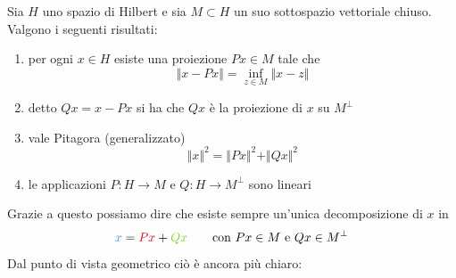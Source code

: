 \begin{thm}
Sia $H$ uno spazio di Hilbert e sia $M\subset H$ un suo sottospazio vettoriale chiuso. Valgono i seguenti risultati:

\renewcommand{\theenumi}{\roman{enumi}}
\begin{enumerate}
    \item per ogni $ x\in H$ esiste una proiezione $Px\in M$ tale che 
    $$
    \Vert x - Px \Vert =\inf_{z\in M} \Vert x-z \Vert
    $$
    \item detto $Qx=x-Px$ si ha che $Qx$ è la proiezione di $x$ su $M^{\perp}$ 
    \item vale Pitagora (generalizzato)
    $$
    \Vert x \Vert^{2} = \Vert Px \Vert^{2} + \Vert Qx \Vert^{2}
    $$
    \item le applicazioni $P: H\rightarrow M$ e $Q: H\rightarrow M^{\perp}$ sono lineari
\end{enumerate}
\end{thm}

Grazie a questo possiamo dire che esiste sempre un'unica decomposizione di $x$ in 
\begin{equation*}
\textcolor[rgb]{0.29, 0.56, 0.89}{x} = \textcolor[rgb]{0.82, 0.01, 0.11}{Px}+\textcolor[rgb]{0.49, 0.83, 0.13}{Qx}\qquad \text{con }Px\in M\text{ e }Qx\in M^\perp
\end{equation*}
Dal punto di vista geometrico ciò è ancora più chiaro:


